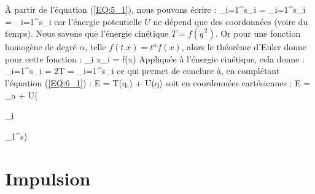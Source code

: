 \`A partir de l'\'equation (\ref{EQ:5_1}), nous pouvons \'ecrire :
\benn
	\sum_{i=1}^{s}_{i} = \sum_{i=1}^{s}_{i} = \sum_{i=1}^{s}_{i}
\eenn
car l'\'energie potentielle $U$ ne d\'epend que des coordonn\'ees (voire du temps).
Nous savons que l'\'energie cin\'etique $T = f(\dot{q}^{\,2})$. Or pour une fonction homog\`ene de degr\'e $\alpha$, telle $f(t.x) = t^{\alpha}f(x)$, alors le th\'eor\`eme d'Euler donne pour cette fonction :
\benn
	\sum_{i} x_{i} = \alpha f(x)
\eenn
Appliqu\'ee \`a l'\'energie cin\'etique, cela donne :
\be
	\sum_{i=1}^{s}_{i} = 2T = \sum_{i=1}^{s}_{i} \label{EQ:6_1_1}
\ee
ce qui permet de conclure \`a, en compl\'etant l'\'equation (\ref{EQ:6_1}) :
\be
	E = T(q,) + U(q) \label{EQ:6_2}
\ee
soit en coordonn\'ees cart\'esiennes :
\be
	E = \sum_{a} + U(\begin{Bmatrix}_{i}\end{Bmatrix}_{1}^{s}) \label{EQ:6_3}
\ee

\section{Impulsion}\label{PAR:7}

